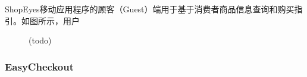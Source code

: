 ShopEyes移动应用程序的顾客（Guest）端用于基于消费者商品信息查询和购买指引。如图所示，用户

\begin{figure}[htbp]
    \centering
    \hfill
	\caption{(todo)}
	\label{fig:seg-assist}
\end{figure}

\subsubsection{EasyCheckout}

